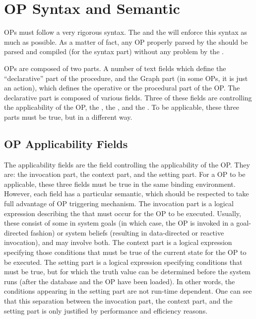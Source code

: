 \chapter{OP Syntax and Semantic}

OPs must follow a very rigorous syntax. The \OPE{} and the \CPK{} will
enforce this syntax as much as possible. As a matter of fact, any OP
properly parsed by the \OPE{} should be parsed and compiled (for the
syntax part) without any problem by the \CPK{}.

OPs are composed of two parts. A number of text fields which define the
``declarative'' part of the procedure, and the Graph part (in some OPs, it is
just an action), which defines the operative or the procedural part of the OP.
The declarative part is composed of various fields. Three of these fields are
controlling the applicability of the OP, the , the
, and the . To be applicable, these three
parts must be true, but in a different way.



\section{OP Applicability Fields}

The applicability fields are the field controlling the applicability of the OP.
They are: the invocation part, the context part, and the setting part. For a OP
to be applicable, these three fields must be true in the same binding
environment. However, each field has a particular semantic, which should be
respected to take full advantage of \COPRS{} OP triggering mechanism. The
invocation part is a logical expression describing the  that must
occur for the OP to be executed. Usually, these consist of some 
in system goals (in which case, the OP is invoked in a goal-directed fashion)
or system beliefs (resulting in data-directed or reactive invocation), and may
involve both. The context part is a logical expression specifying those
conditions that must be true of the current state for the OP to be executed.
The setting part is a logical expression specifying conditions that must be
true, but for which the truth value can be determined before the system runs
(after the database and the OP have been loaded). In other words, the conditions
appearing in the setting part are not run-time dependent. One can see that this
separation between the invocation part, the context part, and the setting part
is only justified by performance and efficiency reasons.



